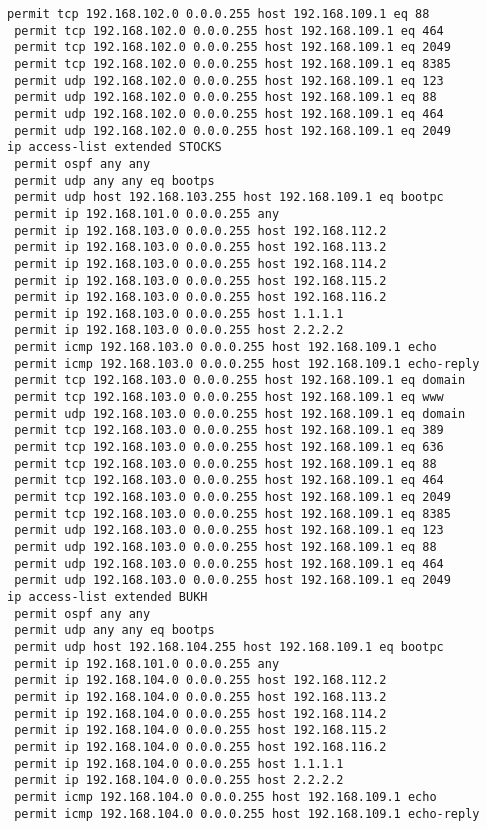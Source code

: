 \documentclass[14pt, a4paper]{extarticle}
\begin{document}
\begin{appendices}
\begin{lstlisting}[caption=Конфигурация устройства SW\_2\_L3\_IVANOV\label{list:conf_sw2_l3}]
 permit tcp 192.168.102.0 0.0.0.255 host 192.168.109.1 eq 88
 permit tcp 192.168.102.0 0.0.0.255 host 192.168.109.1 eq 464
 permit tcp 192.168.102.0 0.0.0.255 host 192.168.109.1 eq 2049
 permit tcp 192.168.102.0 0.0.0.255 host 192.168.109.1 eq 8385
 permit udp 192.168.102.0 0.0.0.255 host 192.168.109.1 eq 123
 permit udp 192.168.102.0 0.0.0.255 host 192.168.109.1 eq 88
 permit udp 192.168.102.0 0.0.0.255 host 192.168.109.1 eq 464
 permit udp 192.168.102.0 0.0.0.255 host 192.168.109.1 eq 2049
ip access-list extended STOCKS
 permit ospf any any
 permit udp any any eq bootps
 permit udp host 192.168.103.255 host 192.168.109.1 eq bootpc
 permit ip 192.168.101.0 0.0.0.255 any
 permit ip 192.168.103.0 0.0.0.255 host 192.168.112.2
 permit ip 192.168.103.0 0.0.0.255 host 192.168.113.2
 permit ip 192.168.103.0 0.0.0.255 host 192.168.114.2
 permit ip 192.168.103.0 0.0.0.255 host 192.168.115.2
 permit ip 192.168.103.0 0.0.0.255 host 192.168.116.2
 permit ip 192.168.103.0 0.0.0.255 host 1.1.1.1
 permit ip 192.168.103.0 0.0.0.255 host 2.2.2.2
 permit icmp 192.168.103.0 0.0.0.255 host 192.168.109.1 echo
 permit icmp 192.168.103.0 0.0.0.255 host 192.168.109.1 echo-reply
 permit tcp 192.168.103.0 0.0.0.255 host 192.168.109.1 eq domain
 permit tcp 192.168.103.0 0.0.0.255 host 192.168.109.1 eq www
 permit udp 192.168.103.0 0.0.0.255 host 192.168.109.1 eq domain
 permit tcp 192.168.103.0 0.0.0.255 host 192.168.109.1 eq 389
 permit tcp 192.168.103.0 0.0.0.255 host 192.168.109.1 eq 636
 permit tcp 192.168.103.0 0.0.0.255 host 192.168.109.1 eq 88
 permit tcp 192.168.103.0 0.0.0.255 host 192.168.109.1 eq 464
 permit tcp 192.168.103.0 0.0.0.255 host 192.168.109.1 eq 2049
 permit tcp 192.168.103.0 0.0.0.255 host 192.168.109.1 eq 8385
 permit udp 192.168.103.0 0.0.0.255 host 192.168.109.1 eq 123
 permit udp 192.168.103.0 0.0.0.255 host 192.168.109.1 eq 88
 permit udp 192.168.103.0 0.0.0.255 host 192.168.109.1 eq 464
 permit udp 192.168.103.0 0.0.0.255 host 192.168.109.1 eq 2049
ip access-list extended BUKH
 permit ospf any any
 permit udp any any eq bootps
 permit udp host 192.168.104.255 host 192.168.109.1 eq bootpc
 permit ip 192.168.101.0 0.0.0.255 any
 permit ip 192.168.104.0 0.0.0.255 host 192.168.112.2
 permit ip 192.168.104.0 0.0.0.255 host 192.168.113.2
 permit ip 192.168.104.0 0.0.0.255 host 192.168.114.2
 permit ip 192.168.104.0 0.0.0.255 host 192.168.115.2
 permit ip 192.168.104.0 0.0.0.255 host 192.168.116.2
 permit ip 192.168.104.0 0.0.0.255 host 1.1.1.1
 permit ip 192.168.104.0 0.0.0.255 host 2.2.2.2
 permit icmp 192.168.104.0 0.0.0.255 host 192.168.109.1 echo
 permit icmp 192.168.104.0 0.0.0.255 host 192.168.109.1 echo-reply

\end{lstlisting}
\end{appendices}
\end{document}
